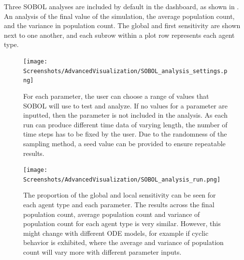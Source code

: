 Three SOBOL analyses are included by default in the dashboard, as shown in . 
An analysis of the final value of the simulation, the average population count, and the variance in population count. 
The global and first sensitivity are shown next to one another, and each subrow within a plot row represents each agent type. 
\begin{figure}
    \centering
    \texttt{[image: Screenshots/AdvancedVisualization/SOBOL\_analysis\_settings.png]}
    \caption{
		For each parameter, the user can choose a range of values that SOBOL will use to test and analyze. 
		If no values for a parameter are inputted, then the parameter is not included in the analysis. 
        As each run can produce different time data of varying length, the number of time steps has to be fixed by the user. 
        Due to the randomness of the sampling method, a seed value can be provided to ensure repeatable results. 
    }
    \label{fig:ss:av:SOBOL_analysis_settings}
\end{figure}
\begin{figure}
    \centering
    \texttt{[image: Screenshots/AdvancedVisualization/SOBOL\_analysis\_run.png]}
    \caption{
        The proportion of the global and local sensitivity can be seen for each agent type and each parameter. 
        The results across the final population count, average population count and variance of population count for each agent type is very similar. 
        However, this might change with different ODE models, for example if cyclic behavior is exhibited, where the average and variance of population count will vary more with different parameter inputs. 
    }
    \label{fig:ss:av:SOBOL_analysis_run}
\end{figure}

